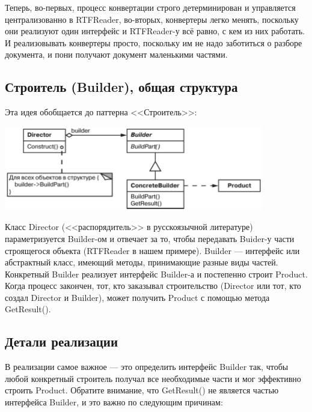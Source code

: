 \documentclass{../text-style}
\begin{document}
Теперь, во-первых, процесс конвертации строго детерминирован и управляется централизованно в RTFReader, во-вторых, конвертеры легко менять, поскольку они реализуют один интерфейс и RTFReader-у всё равно, с кем из них работать. И реализовывать конвертеры просто, поскольку им не надо заботиться о разборе документа, и пони получают документ маленькими частями.

\subsection{Строитель (Builder), общая структура}

Эта идея обобщается до паттерна <<Строитель>>:

\begin{center}
    \includegraphics[width=0.85\textwidth]{builder.png}
\end{center}

Класс Director (<<распорядитель>> в русскоязычной литературе) параметризуется Builder-ом и отвечает за то, чтобы передавать Buider-у части строящегося объекта (RTFReader в нашем примере). Builder --- интерфейс или абстрактный класс, имеющий методы, принимающие разные виды частей. Конкретный Builder реализует интерфейс Builder-а и постепенно строит Product. Когда процесс закончен, тот, кто заказывал строительство (Director или тот, кто создал Director и Builder), может получить Product с помощью метода GetResult().

\subsection{Детали реализации}

В реализации самое важное --- это определить интерфейс Builder так, чтобы любой конкретный строитель получал все необходимые части и мог эффективно строить Product. Обратите внимание, что GetResult() не является частью интерфейса Builder, и это важно по следующим причинам:
\end{document}

